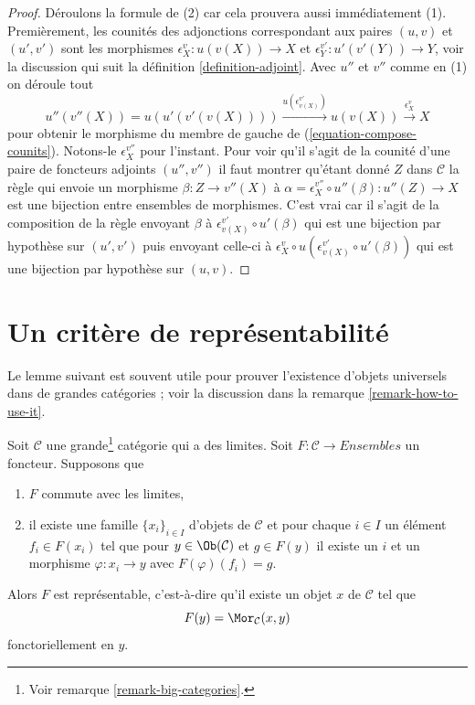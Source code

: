 \begin{proof}
Déroulons la formule de (2) car cela prouvera aussi immédiatement (1).
Premièrement, les counités des adjonctions correspondant aux paires $(u, v)$ et $(u', v')$
sont les morphismes $\epsilon_X^v : u(v(X)) \to X$ et $\epsilon_Y^{v'} : u'(v'(Y)) \to Y$, voir la discussion qui suit la définition
\ref{definition-adjoint}. Avec $u''$ et $v''$ comme en (1) on déroule tout
$$
u''(v''(X)) = u(u'(v'(v(X)))) \xrightarrow{u(\epsilon_{v(X)}^{v'})}
u(v(X)) \xrightarrow{\epsilon_X^v} X
$$
pour obtenir le morphisme du membre de gauche de
(\ref{equation-compose-counits}). Notons-le $\epsilon_X^{v''}$ pour
l'instant. Pour voir qu'il s'agit de la counité d'une paire de foncteurs adjoints $(u'', v'')$
il faut montrer qu'étant donné $Z$ dans $\mathcal{C}$ la règle qui envoie un
morphisme $\beta : Z \to v''(X)$ à $\alpha = \epsilon_X^{v''} \circ u''(\beta) : u''(Z) \to X$ est une bijection entre ensembles de morphismes. C'est vrai
car il s'agit de la composition de la règle envoyant $\beta$ à
$\epsilon_{v(X)}^{v'} \circ u'(\beta)$ qui est une bijection par hypothèse sur
$(u', v')$ puis envoyant celle-ci à $\epsilon_X^v \circ u(\epsilon_{v(X)}^{v'} \circ u'(\beta))$ qui est une bijection par hypothèse sur $(u, v)$.
\end{proof}






\section{Un critère de représentabilité}
\label{section-representable}

\noindent
Le lemme suivant est souvent utile pour prouver l'existence d'objets
universels dans de grandes catégories ; voir la discussion dans
la remarque \ref{remark-how-to-use-it}.

\begin{lemma}
\label{lemma-a-version-of-brown}
Soit $\mathcal{C}$ une grande\footnote{Voir remarque
\ref{remark-big-categories}.} catégorie qui a des limites. Soit $F : \mathcal{C} \to \textit{Ensembles}$ un foncteur. Supposons que
\begin{enumerate}
\item $F$ commute avec les limites,
\item il existe une famille $\{x_i\}_{i \in I}$ d'objets de $\mathcal{C}$ et
pour chaque $i \in I$ un élément $f_i \in F(x_i)$ tel que pour $y \in \Ob(\mathcal{C})$ et $g \in F(y)$ il existe un $i$ et un morphisme $\varphi : x_i \to y$ avec $F(\varphi)(f_i) = g$.
\end{enumerate}
Alors $F$ est représentable, c'est-à-dire qu'il existe un objet $x$ de
$\mathcal{C}$ tel que
$$
F(y) = \Mor_\mathcal{C}(x, y)
$$
fonctoriellement en $y$.
\end{lemma}

